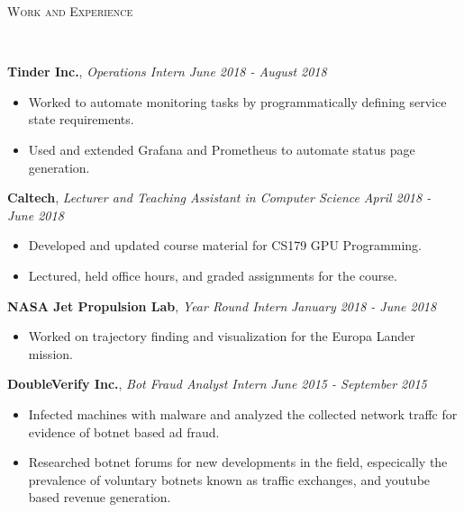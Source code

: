 \documentclass[9pt]{article}
\newenvironment{changemargin}[2]{%
  \begin{list}{}{%
    \setlength{\topsep}{0pt}%
    \setlength{\leftmargin}{#1}%
    \setlength{\rightmargin}{#2}%
    \setlength{\listparindent}{\parindent}%
    \setlength{\itemindent}{\parindent}%
    \setlength{\parsep}{\parskip}%
  }%
  \item[]}{\end{list}
}
\newcommand{\lineover}{
	\begin{changemargin}{-0.05in}{-0.05in}
		\vspace*{-8pt}
		\hrulefill \\
		\vspace*{-2pt}
	\end{changemargin}
}
\newcommand{\header}[1]{
	\begin{changemargin}{-0.5in}{-0.5in}
		\scshape{#1}\\
  	\lineover
	\end{changemargin}
}
\newenvironment{body} {
	\vspace*{-16pt}
	\begin{changemargin}{-0.25in}{-0.5in}
  }	
	{\end{changemargin}
}
\begin{document}
\header{Work and Experience}
\begin{body}
	\vspace{14pt}
	\textbf{Tinder Inc.}, \emph{Operations Intern} \hfill \emph{June 2018 - August 2018}\\
	\vspace*{-3pt}
	\begin{itemize} \itemsep -0pt %
		\item Worked to automate monitoring tasks by programmatically defining service state requirements.
		\item Used and extended Grafana and Prometheus to automate status page generation.
	\end{itemize}
	\vspace*{-2pt}

	\textbf{Caltech}, \emph{Lecturer and Teaching Assistant in Computer Science} \hfill \emph{April 2018 - June 2018}\\
	\vspace*{-3pt}
	\begin{itemize} \itemsep -0pt %
		\item Developed and updated course material for CS179 GPU Programming.
		\item Lectured, held office hours, and graded assignments for the course. 
	\end{itemize}
	\vspace*{-2pt}

	\textbf{NASA Jet Propulsion Lab}, \emph{Year Round Intern} \hfill \emph{January 2018 - June 2018}\\
	\vspace*{-3pt}
	\begin{itemize} \itemsep -0pt %
		\item Worked on trajectory finding and visualization for the Europa Lander mission. 
	\end{itemize}
	\vspace*{-2pt}

	\textbf{DoubleVerify Inc.}, \emph{Bot Fraud Analyst Intern} \hfill \emph{June 2015 - September 2015}\\
	\vspace*{-3pt}
	\begin{itemize} \itemsep -0pt %
		\item Infected machines with malware and analyzed the collected network traffc for evidence of botnet based ad fraud.
		\item Researched botnet forums for new developments in the field, especically the prevalence of voluntary botnets known as traffic exchanges, and youtube based revenue generation.
	\end{itemize}
	\vspace*{-2pt}


\end{body}
\end{document}
